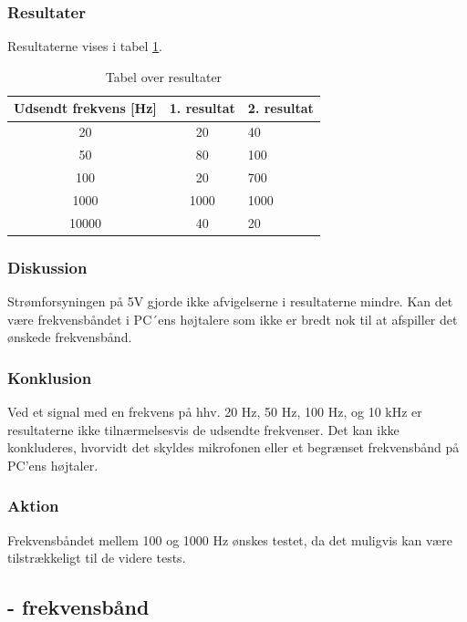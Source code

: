 		\subsubsection{Resultater}
		Resultaterne vises i tabel \ref{elektrettofemresultater}. 
		\begin{table}[]
				\centering
				\caption{Tabel over resultater}
				\label{elektrettofemresultater}
				\begin{tabular}{lll}
					\multicolumn{1}{l|}{\textbf{Udsendt frekvens {[}Hz{]}}} & 	
					\multicolumn{1}{l|}{\textbf{1. resultat}} & \textbf{2. resultat} \\ \hline
					\multicolumn{1}{c|}{20}& 
					\multicolumn{1}{c|}{20}&40\\
					\multicolumn{1}{c|}{50}& 
					\multicolumn{1}{c|}{80}&100\\
					\multicolumn{1}{c|}{100}& 
					\multicolumn{1}{c|}{20}&700\\
					\multicolumn{1}{c|}{1000}& 
					\multicolumn{1}{c|}{1000}&1000\\
					\multicolumn{1}{c|}{10000}& 
					\multicolumn{1}{c|}{40}&20\\
                   
				\end{tabular}
			\end{table}
		
		\subsubsection{Diskussion} 
		Strømforsyningen på 5V gjorde ikke afvigelserne i resultaterne mindre. Kan det være frekvensbåndet i PC´ens højtalere som ikke er bredt nok til at afspiller det ønskede frekvensbånd. 
		\subsubsection{Konklusion}
	Ved et signal med en frekvens på hhv. 20 Hz, 50 Hz, 100 Hz, og 10 kHz er resultaterne ikke tilnærmelsesvis de udsendte frekvenser. 
	Det kan ikke konkluderes, hvorvidt det skyldes mikrofonen eller et begrænset frekvensbånd på PC'ens højtaler. 
		\subsubsection{Aktion}
		Frekvensbåndet mellem 100 og 1000 Hz ønskes testet, da det muligvis kan være tilstrækkeligt til de videre tests. 
		
\subsection{\elektretto - frekvensbånd}
